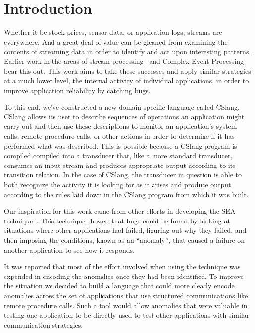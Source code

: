\section{Introduction}
\label{SEC:introduction}

Whether it be stock prices, sensor data, or application logs,
streams are everywhere.
And a great deal of value can be gleaned
from examining the contents of streaming data
in order to identify and act upon
interesting patterns.
Earlier work in the areas of stream
processing~\cite{asdf}
and Complex Event Processing~\cite{asdf} bear this
out.
This work aims to take these successes
and apply similar strategies
at a much lower level,
the internal activity of individual applications,
in order to improve application reliability by catching bugs.

To this end,
we've constructed
a new domain specific language called CSlang.
CSlang allows its user to describe sequences of operations an application
might carry out and
then use these descriptions
to monitor an application's system calls,
remote procedure calls,
or other actions in order to determine if it has
performed what was described.
This is possible because a CSlang program is compiled
compiled into a transducer that,
like a more standard transducer,
consumes an input stream
and produces appropriate output
according to its transition relation.
In the case of CSlang,
the transducer in question is able to
both recognize the activity it is looking for as it arises
and produce output according to the rules laid down in the CSlang
program from which it was built.

Our inspiration for this work came from other efforts in developing
the SEA technique~\cite{ASDF}.
This technique showed that bugs could be found by looking at situations
where other
applications had failed, figuring out why they failed, and then imposing
the conditions, known as an ``anomaly'',
that caused a failure on another application to see how it
responds.

It was reported that most of the effort involved when using the technique
was expended in encoding the anomalies once
they had been identified.
To improve the situation we decided to build a language
that could more clearly
encode anomalies across the set of applications that use
structured communications like remote procedure calls.
Such a tool would allow
anomalies that were
valuable in testing one application to be directly used to test other
applications with similar communication strategies.

